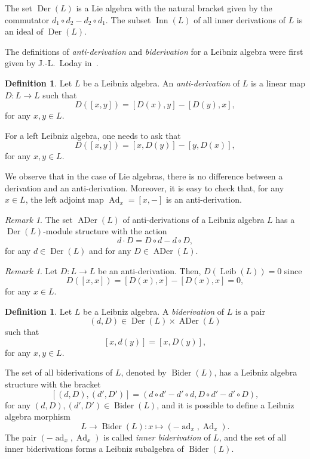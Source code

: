 \documentclass[11pt,a4paper]{amsart}
\theoremstyle{plain}
\theoremstyle{definition}
\newtheorem{definition}[subsection]{Definition}
\theoremstyle{remark}
\newtheorem{remark}[subsection]{Remark}
\numberwithin{equation}{section}
\newcommand{\0}{\emptyset}
\DeclareMathOperator{\Der}{Der}
\DeclareMathOperator{\ADer}{ADer}
\DeclareMathOperator{\Bider}{Bider}
\DeclareMathOperator{\Inn}{Inn}
\DeclareMathOperator{\ad}{ad}
\DeclareMathOperator{\Ad}{Ad}
\DeclareMathOperator{\Leib}{Leib}
\begin{document}
The set $\Der(L)$ is a Lie algebra with the natural bracket given by the commutator $d_1\circ d_2- d_2\circ d_1$. The subset $\Inn(L)$ of all inner derivations of $L$ is an ideal of $\Der(L)$.

The definitions of \emph{anti-derivation} and \emph{biderivation} for a Leibniz algebra were first given by J.-L.~Loday in~\cite{loday1993}.

\begin{definition}\cite{loday1993}
Let $L$ be a Leibniz algebra. An \emph{anti-derivation} of $L$ is a linear map $D \colon L \to L$ such that 
\[
D([x,y])=[D(x),y]-[D(y),x],
\]
for any $x,y \in L$.
\end{definition}

For a left Leibniz algebra, one needs to ask that
\[
D([x,y])=[x,D(y)]-[y,D(x)],
\]
for any $x,y \in L$.

We observe that in the case of Lie algebras, there is no difference between a derivation and an anti-derivation. Moreover, it is easy to check that, for any $x \in L$, the left adjoint map $\Ad_x=[x,-]$ is an anti-derivation.

\begin{remark}\cite{loday1993}
The set $\ADer(L)$ of anti-derivations of a Leibniz algebra $L$ has a $\Der(L)$-module structure with the action
\[
d \cdot D = D \circ d - d \circ D,
\]
for any $d \in \Der(L)$ and for any $D \in \ADer(L)$.
\end{remark}

\begin{remark}
Let $D \colon L \to L$ be an anti-derivation. Then, $D(\Leib(L))=0$ since
\[
D([x,x])=[D(x),x]-[D(x),x]=0,
\]
for any $x \in L$.
\end{remark}

\begin{definition}\cite{loday1993}
Let $L$ be a Leibniz algebra. A \emph{biderivation} of $L$ is a pair
\[
(d,D) \in \Der(L) \times \ADer(L)
\]
such that
\begin{equation}\label{cond}
[x,d(y)]=[x,D(y)],    
\end{equation}
for any $x,y \in L$.
\end{definition}

The set of all biderivations of $L$, denoted by $\Bider(L)$, has a Leibniz algebra structure with the bracket
\[
[(d,D),(d',D')]=(d \circ d' - d' \circ d, D \circ d' - d' \circ D),
\]
for any $(d,D),(d',D') \in \Bider(L)$, and it is possible to define a Leibniz algebra morphism
\[
L \to \Bider(L) \colon x \mapsto (-\ad_x, \Ad_x).
\]
The pair $(-\ad_x, \Ad_x)$ is called \emph{inner biderivation} of $L$, and the set of all inner biderivations forms a Leibniz subalgebra of $\Bider(L)$.
\end{document}
